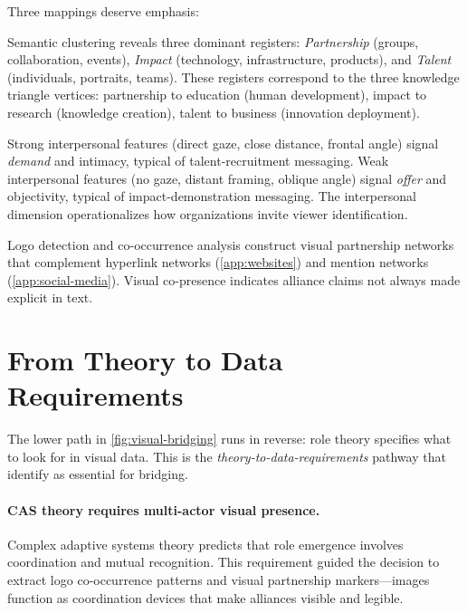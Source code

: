 \documentclass[../main.tex]{subfiles}
\begin{document}
Three mappings deserve emphasis:

\begin{description}[leftmargin=0.5cm, itemsep=0.3em]
\item[CLIP clusters $\rightarrow$ Visual registers.]
Semantic clustering reveals three dominant registers:
\emph{Partnership} (groups, collaboration, events),
\emph{Impact} (technology, infrastructure, products),
and \emph{Talent} (individuals, portraits, teams).
These registers correspond to the three knowledge triangle vertices:
partnership to education (human development),
impact to research (knowledge creation),
talent to business (innovation deployment).

\item[Interpersonal features $\rightarrow$ Engagement mode.]
Strong interpersonal features (direct gaze, close distance, frontal angle)
signal \emph{demand} and intimacy, typical of talent-recruitment messaging.
Weak interpersonal features (no gaze, distant framing, oblique angle)
signal \emph{offer} and objectivity, typical of impact-demonstration messaging.
The interpersonal dimension operationalizes how organizations
invite viewer identification.

\item[Logo co-occurrence $\rightarrow$ Alliance networks.]
Logo detection and co-occurrence analysis construct visual partnership networks
that complement hyperlink networks (\cref{app:websites}) and
mention networks (\cref{app:social-media}).
Visual co-presence indicates alliance claims not always made explicit in text.
\end{description}


\section{From Theory to Data Requirements}
\label{sec:visual-theory-data}

The lower path in \cref{fig:visual-bridging} runs in reverse:
role theory specifies what to look for in visual data.
This is the \emph{theory-to-data-requirements} pathway that
\textcite{maass2018data} identify as essential for bridging.

\paragraph{CAS theory requires multi-actor visual presence.}
Complex adaptive systems theory predicts that role emergence involves
coordination and mutual recognition.
This requirement guided the decision to extract logo co-occurrence patterns
and visual partnership markers---images function as coordination devices
that make alliances visible and legible.
\end{document}
